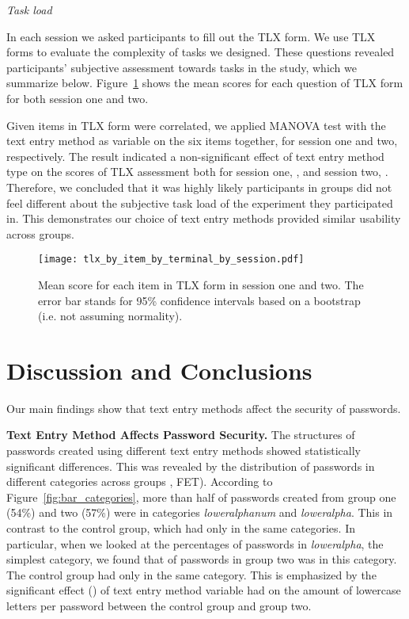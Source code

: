 \documentclass[conference]{IEEEtran}
\begin{document}
\textit{Task load}

In each session we asked participants to fill out the TLX form. We use TLX forms to evaluate the complexity of tasks we designed.  These questions revealed participants' subjective assessment towards tasks in the study, which we summarize below. Figure~\ref{fig:tlx_by_item_by_terminal_by_session} shows the mean scores for each question of TLX form for both session one and two. 

Given items in TLX form were correlated, we applied MANOVA test with the text entry method as variable on the six items together, for session one and two, respectively. The result indicated a non-significant effect of text entry method type on the scores of TLX assessment both for session one, , and session two, . Therefore, we concluded that it was highly likely participants in groups did not feel different about the subjective task load of the experiment they participated in. This demonstrates our choice of text entry methods provided similar usability across groups.

\begin{figure}
\texttt{[image: tlx\_by\_item\_by\_terminal\_by\_session.pdf]}
\caption{\label{fig:tlx_by_item_by_terminal_by_session} Mean score for each item in TLX form in session one and two. The error bar stands for 95\% confidence intervals based on a bootstrap (i.e. not assuming normality).}
\vspace{-9pt}
\end{figure}




\section{Discussion and Conclusions}



Our main findings show that text entry methods affect the security of passwords.

\textbf{Text Entry Method Affects Password Security.}  The structures of passwords created using different text entry methods showed statistically significant differences. This was revealed by the distribution of passwords in different categories across groups , FET). According to Figure~\ref{fig:bar_categories}, more than half of passwords created from group one (54\%) and two (57\%) were in categories \emph{loweralphanum} and \emph{loweralpha}. This in contrast to the control group, which had only  in the same categories. In particular, when we looked at the percentages of passwords in \emph{loweralpha}, the simplest category, we found that  of passwords in group two was in this category. The control group had only  in the same category. This is emphasized by the significant effect () of text entry method variable had on the amount of lowercase letters per password between the control group and group two. 
\end{document}
